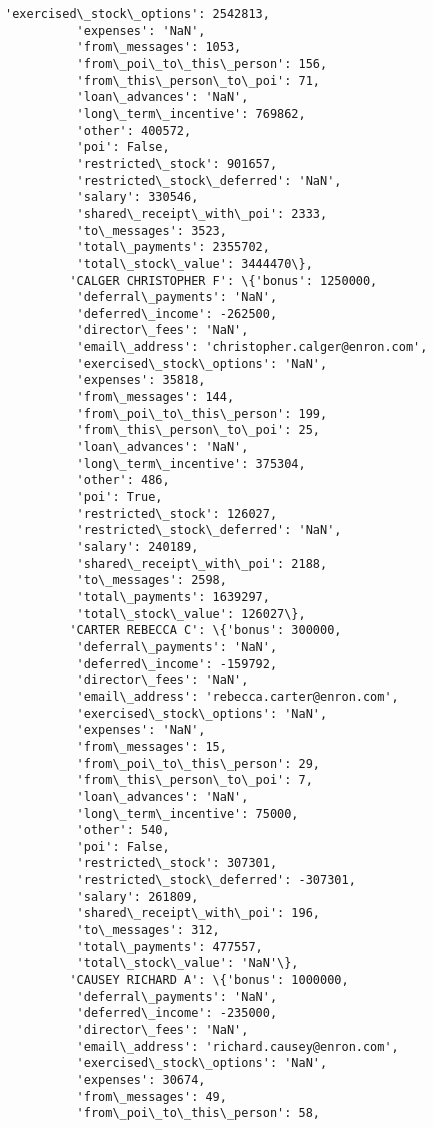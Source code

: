 \documentclass[11pt]{article}
\begin{document}
\begin{Verbatim}[commandchars=\\\{\}]
          'exercised\_stock\_options': 2542813,
          'expenses': 'NaN',
          'from\_messages': 1053,
          'from\_poi\_to\_this\_person': 156,
          'from\_this\_person\_to\_poi': 71,
          'loan\_advances': 'NaN',
          'long\_term\_incentive': 769862,
          'other': 400572,
          'poi': False,
          'restricted\_stock': 901657,
          'restricted\_stock\_deferred': 'NaN',
          'salary': 330546,
          'shared\_receipt\_with\_poi': 2333,
          'to\_messages': 3523,
          'total\_payments': 2355702,
          'total\_stock\_value': 3444470\},
         'CALGER CHRISTOPHER F': \{'bonus': 1250000,
          'deferral\_payments': 'NaN',
          'deferred\_income': -262500,
          'director\_fees': 'NaN',
          'email\_address': 'christopher.calger@enron.com',
          'exercised\_stock\_options': 'NaN',
          'expenses': 35818,
          'from\_messages': 144,
          'from\_poi\_to\_this\_person': 199,
          'from\_this\_person\_to\_poi': 25,
          'loan\_advances': 'NaN',
          'long\_term\_incentive': 375304,
          'other': 486,
          'poi': True,
          'restricted\_stock': 126027,
          'restricted\_stock\_deferred': 'NaN',
          'salary': 240189,
          'shared\_receipt\_with\_poi': 2188,
          'to\_messages': 2598,
          'total\_payments': 1639297,
          'total\_stock\_value': 126027\},
         'CARTER REBECCA C': \{'bonus': 300000,
          'deferral\_payments': 'NaN',
          'deferred\_income': -159792,
          'director\_fees': 'NaN',
          'email\_address': 'rebecca.carter@enron.com',
          'exercised\_stock\_options': 'NaN',
          'expenses': 'NaN',
          'from\_messages': 15,
          'from\_poi\_to\_this\_person': 29,
          'from\_this\_person\_to\_poi': 7,
          'loan\_advances': 'NaN',
          'long\_term\_incentive': 75000,
          'other': 540,
          'poi': False,
          'restricted\_stock': 307301,
          'restricted\_stock\_deferred': -307301,
          'salary': 261809,
          'shared\_receipt\_with\_poi': 196,
          'to\_messages': 312,
          'total\_payments': 477557,
          'total\_stock\_value': 'NaN'\},
         'CAUSEY RICHARD A': \{'bonus': 1000000,
          'deferral\_payments': 'NaN',
          'deferred\_income': -235000,
          'director\_fees': 'NaN',
          'email\_address': 'richard.causey@enron.com',
          'exercised\_stock\_options': 'NaN',
          'expenses': 30674,
          'from\_messages': 49,
          'from\_poi\_to\_this\_person': 58,

\end{Verbatim}
\end{document}
